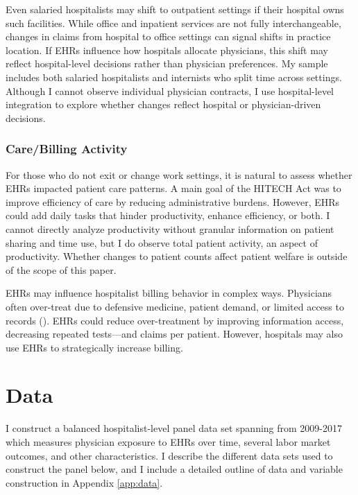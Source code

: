 \documentclass[12pt]{article}
\begin{document}
Even salaried hospitalists may shift to outpatient settings if their hospital owns such facilities. While office and inpatient services are not fully interchangeable, changes in claims from hospital to office settings can signal shifts in practice location. If EHRs influence how hospitals allocate physicians, this shift may reflect hospital-level decisions rather than physician preferences. My sample includes both salaried hospitalists and internists who split time across settings. Although I cannot observe individual physician contracts, I use hospital-level integration to explore whether changes reflect hospital or physician-driven decisions.

\subsubsection{Care/Billing Activity}

For those who do not exit or change work settings, it is natural to assess whether EHRs impacted patient care patterns. A main goal of the HITECH Act was to improve efficiency of care by reducing administrative burdens. However, EHRs could add daily tasks that hinder productivity, enhance efficiency, or both. I cannot directly analyze productivity without granular information on patient sharing and time use, but I do observe total patient activity, an aspect of productivity. Whether changes to patient counts affect patient welfare is outside of the scope of this paper.

EHRs may influence hospitalist billing behavior in complex ways. Physicians often over-treat due to defensive medicine, patient demand, or limited access to records (\cite{lyu2017overtreatment}). EHRs could reduce over-treatment by improving information access, decreasing repeated tests—and claims per patient. However, hospitals may also use EHRs to strategically increase billing. 



\section{Data}\label{sec:data}

I construct a balanced hospitalist-level panel data set spanning from 2009-2017 which measures physician exposure to EHRs over time, several labor market outcomes, and other characteristics. I describe the different data sets used to construct the panel below, and I include a detailed outline of data and variable construction in Appendix \ref{app:data}.
\end{document}
